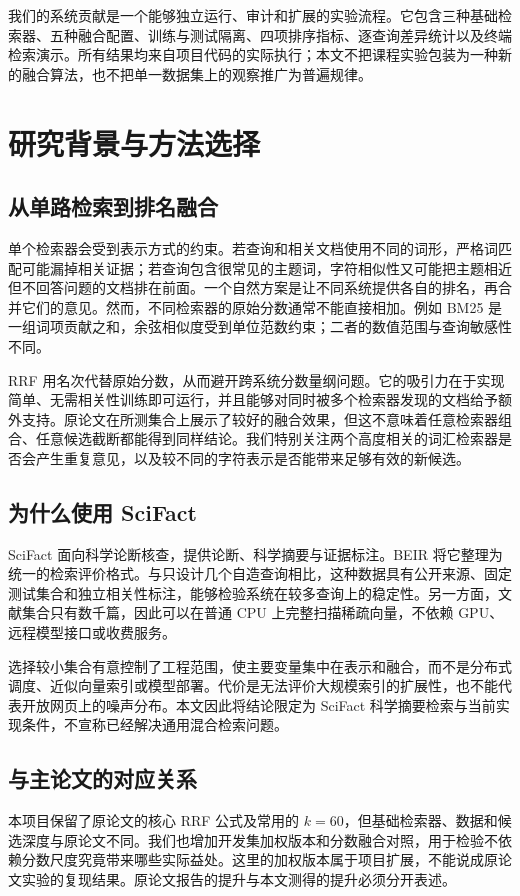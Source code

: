 \documentclass[sigconf,nonacm]{acmart}
\begin{document}
我们的系统贡献是一个能够独立运行、审计和扩展的实验流程。它包含三种基础检索器、五种融合配置、训练与测试隔离、四项排序指标、逐查询差异统计以及终端检索演示。所有结果均来自项目代码的实际执行；本文不把课程实验包装为一种新的融合算法，也不把单一数据集上的观察推广为普遍规律。

\section{研究背景与方法选择}
\subsection{从单路检索到排名融合}
单个检索器会受到表示方式的约束。若查询和相关文档使用不同的词形，严格词匹配可能漏掉相关证据；若查询包含很常见的主题词，字符相似性又可能把主题相近但不回答问题的文档排在前面。一个自然方案是让不同系统提供各自的排名，再合并它们的意见。然而，不同检索器的原始分数通常不能直接相加。例如 BM25 是一组词项贡献之和，余弦相似度受到单位范数约束；二者的数值范围与查询敏感性不同。

RRF 用名次代替原始分数，从而避开跨系统分数量纲问题。它的吸引力在于实现简单、无需相关性训练即可运行，并且能够对同时被多个检索器发现的文档给予额外支持。原论文在所测集合上展示了较好的融合效果，但这不意味着任意检索器组合、任意候选截断都能得到同样结论。我们特别关注两个高度相关的词汇检索器是否会产生重复意见，以及较不同的字符表示是否能带来足够有效的新候选。

\subsection{为什么使用 SciFact}
SciFact 面向科学论断核查，提供论断、科学摘要与证据标注\cite{wadden2020scifact}。BEIR 将它整理为统一的检索评价格式\cite{thakur2021beir}。与只设计几个自造查询相比，这种数据具有公开来源、固定测试集合和独立相关性标注，能够检验系统在较多查询上的稳定性。另一方面，文献集合只有数千篇，因此可以在普通 CPU 上完整扫描稀疏向量，不依赖 GPU、远程模型接口或收费服务。

选择较小集合有意控制了工程范围，使主要变量集中在表示和融合，而不是分布式调度、近似向量索引或模型部署。代价是无法评价大规模索引的扩展性，也不能代表开放网页上的噪声分布。本文因此将结论限定为 SciFact 科学摘要检索与当前实现条件，不宣称已经解决通用混合检索问题。

\subsection{与主论文的对应关系}
本项目保留了原论文的核心 RRF 公式及常用的 $k=60$，但基础检索器、数据和候选深度与原论文不同。我们也增加开发集加权版本和分数融合对照，用于检验不依赖分数尺度究竟带来哪些实际益处。这里的加权版本属于项目扩展，不能说成原论文实验的复现结果。原论文报告的提升与本文测得的提升必须分开表述。
\end{document}
